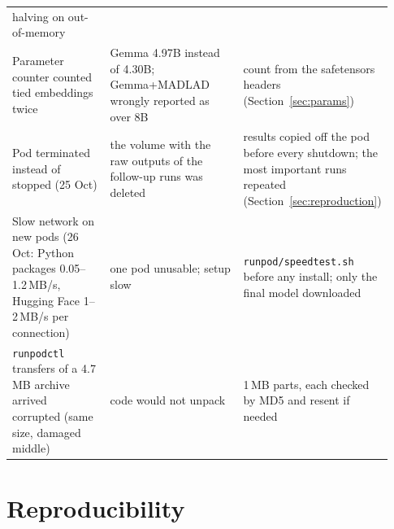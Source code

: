 \documentclass[10pt,a4paper]{article}
\begin{document}
{\begin{longtable}{p{0.27\linewidth}p{0.36\linewidth}p{0.3\linewidth}}
halving on out-of-memory\\
Parameter counter counted tied embeddings twice & Gemma 4.97B instead of 4.30B; Gemma+MADLAD wrongly reported as
over 8B & count from the safetensors headers (Section~\ref{sec:params})\\
Pod terminated instead of stopped (25 Oct) & the volume with the raw outputs of the follow-up runs was deleted &
results copied off the pod before every shutdown; the most important runs repeated (Section~\ref{sec:reproduction})\\
Slow network on new pods (26 Oct: Python packages 0.05--1.2\,MB/s, Hugging Face 1--2\,MB/s per connection) & one
pod unusable; setup slow & \texttt{runpod/speedtest.sh} before any install; only the final model downloaded\\
\texttt{runpodctl} transfers of a 4.7\,MB archive arrived corrupted (same size, damaged middle) & code would not
unpack & 1\,MB parts, each checked by MD5 and resent if needed\\
\bottomrule
\end{longtable}}

\section{Reproducibility}\label{sec:repro}
\end{document}
